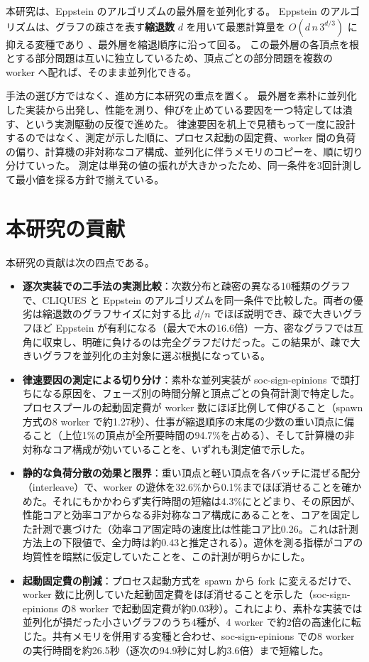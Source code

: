 本研究は、Eppstein のアルゴリズムの最外層を並列化する。
Eppstein のアルゴリズムは、グラフの疎さを表す\textbf{縮退数} $d$ を用いて最悪計算量を $O(d\,n\,3^{d/3})$ に抑える変種であり \cite{eppstein2010}、最外層を縮退順序に沿って回る。
この最外層の各頂点を根とする部分問題は互いに独立しているため、頂点ごとの部分問題を複数の worker へ配れば、そのまま並列化できる。

手法の選び方ではなく、進め方に本研究の重点を置く。
最外層を素朴に並列化した実装から出発し、性能を測り、伸びを止めている要因を一つ特定しては潰す、という実測駆動の反復で進めた。
律速要因を机上で見積もって一度に設計するのではなく、測定が示した順に、プロセス起動の固定費、worker 間の負荷の偏り、計算機の非対称なコア構成、並列化に伴うメモリのコピーを、順に切り分けていった。
測定は単発の値の振れが大きかったため、同一条件を3回計測して最小値を採る方針で揃えている。

\section{本研究の貢献}
\label{sec:intro-contributions}

本研究の貢献は次の四点である。

\begin{itemize}
  \item \textbf{逐次実装での二手法の実測比較}：次数分布と疎密の異なる10種類のグラフで、CLIQUES と Eppstein のアルゴリズムを同一条件で比較した。両者の優劣は縮退数のグラフサイズに対する比 $d/n$ でほぼ説明でき、疎で大きいグラフほど Eppstein が有利になる（最大で木の16.6倍）一方、密なグラフでは互角に収束し、明確に負けるのは完全グラフだけだった。この結果が、疎で大きいグラフを並列化の主対象に選ぶ根拠になっている。
  \item \textbf{律速要因の測定による切り分け}：素朴な並列実装が soc-sign-epinions で頭打ちになる原因を、フェーズ別の時間分解と頂点ごとの負荷計測で特定した。プロセスプールの起動固定費が worker 数にほぼ比例して伸びること（spawn 方式の8 worker で約1.27秒）、仕事が縮退順序の末尾の少数の重い頂点に偏ること（上位1\%の頂点が全所要時間の94.7\%を占める）、そして計算機の非対称なコア構成が効いていることを、いずれも測定値で示した。
  \item \textbf{静的な負荷分散の効果と限界}：重い頂点と軽い頂点を各バッチに混ぜる配分（interleave）で、worker の遊休を32.6\%から0.1\%までほぼ消せることを確かめた。それにもかかわらず実行時間の短縮は4.3\%にとどまり、その原因が、性能コアと効率コアからなる非対称なコア構成にあることを、コアを固定した計測で裏づけた（効率コア固定時の速度比は性能コア比0.26。これは計測方法上の下限値で、全力時は約0.43と推定される）。遊休を測る指標がコアの均質性を暗黙に仮定していたことを、この計測が明らかにした。
  \item \textbf{起動固定費の削減}：プロセス起動方式を spawn から fork に変えるだけで、worker 数に比例していた起動固定費をほぼ消せることを示した（soc-sign-epinions の8 worker で起動固定費が約0.03秒）。これにより、素朴な実装では並列化が損だった小さいグラフのうち4種が、4 worker で約2倍の高速化に転じた。共有メモリを併用する変種と合わせ、soc-sign-epinions での8 worker の実行時間を約26.5秒（逐次の94.9秒に対し約3.6倍）まで短縮した。
\end{itemize}

